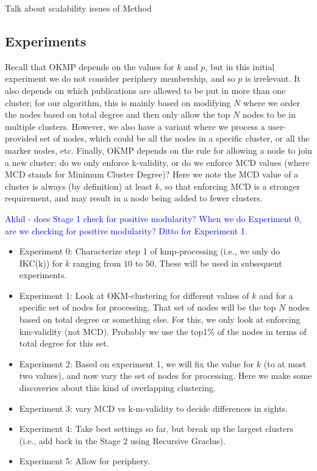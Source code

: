 \documentclass{article}
\begin{document}
Talk about scalability issues of Method



\subsection{Experiments}

 
Recall that OKMP depends on the values for $k$ and $p$, but in this initial experiment we do not 
consider periphery membership, and so $p$ is irrelevant.
It also depends on which publications are allowed to be
put in more than one cluster; for our algorithm, this is mainly based on modifying $N$ where 
we order the nodes based on total degree and then only allow the top $N$ nodes to be in multiple clusters.
However, we also have a variant where we process a user-provided set of nodes, which could be all the nodes in a specific cluster, or  all the marker nodes, etc. 
Finally, OKMP depends on the rule for allowing a node to join a new cluster: do we only enforce k-validity, or do
we enforce MCD values (where MCD stands for Minimum Cluster Degree)? Here we note the MCD value of a cluster is
always (by definition) at least $k$, so that enforcing MCD is a stronger requirement, and may result in a node being added to
fewer clusters.


\textcolor{blue}{Akhil - does Stage 1 check for positive modularity? When we do Experiment 0, are we checking for positive modularity? Ditto for Experiment 1.}

\begin{itemize}
\item 
Experiment 0: Characterize step 1 of kmp-processing (i.e., we only do IKC(k)) for $k$ ranging from $10$ to $50$. These will be used
in subsequent experiments.
\item Experiment 1:  Look at OKM-clustering for different values of $k$ and for a specific set of nodes for processing. That set of nodes
will be the top $N$ nodes based on total degree or something else. For this, we only look at enforcing km-validity (not MCD).  Probably we use the top1\% of the nodes in terms of total degree for this set. 
\item Experiment 2:  Based on experiment 1, we will fix the value for $k$ (to at most two values), and now vary the set of  nodes for processing.
Here we make some discoveries about this kind of overlapping clustering.
\item Experiment 3: vary MCD vs k-m-validity to decide differences in sights.
\item Experiment 4: Take best settings so far, but break up the largest clusters (i.e., add back in the Stage 2 using Recursive Graclus).
\item Experiment 5: Allow for periphery.
\end{itemize}
\end{document}
